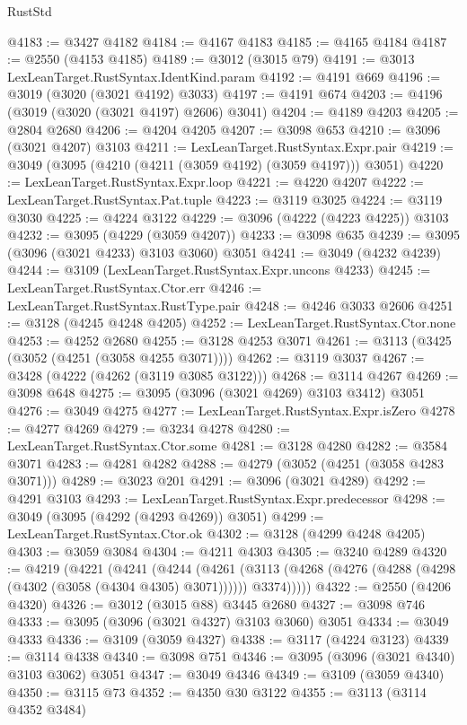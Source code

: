 \begin{lexlean}{RustStd}
\begin{coremodule}
@4183 := @3427 @4182
@4184 := @4167 @4183
@4185 := @4165 @4184
@4187 := @2550 (@4153 @4185)
@4189 := @3012 (@3015 @79)
@4191 := @3013 LexLeanTarget.RustSyntax.IdentKind.param
@4192 := @4191 @669
@4196 := @3019 (@3020 (@3021 @4192) @3033)
@4197 := @4191 @674
@4203 := @4196 (@3019 (@3020 (@3021 @4197) @2606) @3041)
@4204 := @4189 @4203
@4205 := @2804 @2680
@4206 := @4204 @4205
@4207 := @3098 @653
@4210 := @3096 (@3021 @4207) @3103
@4211 := LexLeanTarget.RustSyntax.Expr.pair
@4219 := @3049 (@3095 (@4210 (@4211 (@3059 @4192) (@3059 @4197))) @3051)
@4220 := LexLeanTarget.RustSyntax.Expr.loop
@4221 := @4220 @4207
@4222 := LexLeanTarget.RustSyntax.Pat.tuple
@4223 := @3119 @3025
@4224 := @3119 @3030
@4225 := @4224 @3122
@4229 := @3096 (@4222 (@4223 @4225)) @3103
@4232 := @3095 (@4229 (@3059 @4207))
@4233 := @3098 @635
@4239 := @3095 (@3096 (@3021 @4233) @3103 @3060) @3051
@4241 := @3049 (@4232 @4239)
@4244 := @3109 (LexLeanTarget.RustSyntax.Expr.uncons @4233)
@4245 := LexLeanTarget.RustSyntax.Ctor.err
@4246 := LexLeanTarget.RustSyntax.RustType.pair
@4248 := @4246 @3033 @2606
@4251 := @3128 (@4245 @4248 @4205)
@4252 := LexLeanTarget.RustSyntax.Ctor.none
@4253 := @4252 @2680
@4255 := @3128 @4253 @3071
@4261 := @3113 (@3425 (@3052 (@4251 (@3058 @4255 @3071))))
@4262 := @3119 @3037
@4267 := @3428 (@4222 (@4262 (@3119 @3085 @3122)))
@4268 := @3114 @4267
@4269 := @3098 @648
@4275 := @3095 (@3096 (@3021 @4269) @3103 @3412) @3051
@4276 := @3049 @4275
@4277 := LexLeanTarget.RustSyntax.Expr.isZero
@4278 := @4277 @4269
@4279 := @3234 @4278
@4280 := LexLeanTarget.RustSyntax.Ctor.some
@4281 := @3128 @4280
@4282 := @3584 @3071
@4283 := @4281 @4282
@4288 := @4279 (@3052 (@4251 (@3058 @4283 @3071)))
@4289 := @3023 @201
@4291 := @3096 (@3021 @4289)
@4292 := @4291 @3103
@4293 := LexLeanTarget.RustSyntax.Expr.predecessor
@4298 := @3049 (@3095 (@4292 (@4293 @4269)) @3051)
@4299 := LexLeanTarget.RustSyntax.Ctor.ok
@4302 := @3128 (@4299 @4248 @4205)
@4303 := @3059 @3084
@4304 := @4211 @4303
@4305 := @3240 @4289
@4320 := @4219
    (@4221
      (@4241
        (@4244
          (@4261
            (@3113 (@4268 (@4276 (@4288 (@4298 (@4302 (@3058 (@4304 @4305) @3071)))))) @3374)))))
@4322 := @2550 (@4206 @4320)
@4326 := @3012 (@3015 @88) @3445 @2680
@4327 := @3098 @746
@4333 := @3095 (@3096 (@3021 @4327) @3103 @3060) @3051
@4334 := @3049 @4333
@4336 := @3109 (@3059 @4327)
@4338 := @3117 (@4224 @3123)
@4339 := @3114 @4338
@4340 := @3098 @751
@4346 := @3095 (@3096 (@3021 @4340) @3103 @3062) @3051
@4347 := @3049 @4346
@4349 := @3109 (@3059 @4340)
@4350 := @3115 @73
@4352 := @4350 @30 @3122
@4355 := @3113 (@3114 @4352 @3484)

\end{coremodule}
\end{lexlean}
